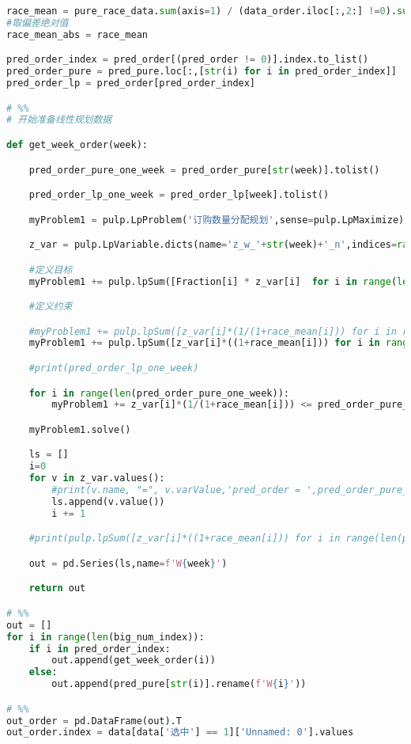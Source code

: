 \begin{appendices}
\begin{lstlisting}[language=python]
race_mean = pure_race_data.sum(axis=1) / (data_order.iloc[:,2:] !=0).sum(axis=1)
#取偏差绝对值
race_mean_abs = race_mean

pred_order_index = pred_order[(pred_order != 0)].index.to_list()
pred_order_pure = pred_pure.loc[:,[str(i) for i in pred_order_index]]
pred_order_lp = pred_order[pred_order_index]

# %%
# 开始准备线性规划数据

def get_week_order(week):

    pred_order_pure_one_week = pred_order_pure[str(week)].tolist()

    pred_order_lp_one_week = pred_order_lp[week].tolist()

    myProblem1 = pulp.LpProblem('订购数量分配规划',sense=pulp.LpMaximize)

    z_var = pulp.LpVariable.dicts(name='z_w_'+str(week)+'_n',indices=range(len(pred_order_pure_one_week)),lowBound=0)

    #定义目标
    myProblem1 += pulp.lpSum([Fraction[i] * z_var[i]  for i in range(len(pred_order_pure_one_week))])

    #定义约束

    #myProblem1 += pulp.lpSum([z_var[i]*(1/(1+race_mean[i])) for i in range(len(pred_order_pure_one_week))]) == 2.84e4 + pred_order_lp_one_week
    myProblem1 += pulp.lpSum([z_var[i]*((1+race_mean[i])) for i in range(len(pred_order_pure_one_week))]) ==pred_order_lp_one_week

    #print(pred_order_lp_one_week)

    for i in range(len(pred_order_pure_one_week)):
        myProblem1 += z_var[i]*(1/(1+race_mean[i])) <= pred_order_pure_one_week[i]

    myProblem1.solve()

    ls = []
    i=0
    for v in z_var.values():
        #print(v.name, "=", v.varValue,'pred_order = ',pred_order_pure_one_week[i],'race =',race_mean[i])
        ls.append(v.value())
        i += 1

    #print(pulp.lpSum([z_var[i]*((1+race_mean[i])) for i in range(len(pred_order_pure_one_week))]).value() )

    out = pd.Series(ls,name=f'W{week}')

    return out

# %%
out = []
for i in range(len(big_num_index)):
    if i in pred_order_index:
        out.append(get_week_order(i))
    else:
        out.append(pred_pure[str(i)].rename(f'W{i}'))

# %%
out_order = pd.DataFrame(out).T
out_order.index = data[data['选中'] == 1]['Unnamed: 0'].values


\end{lstlisting}
\end{appendices}
